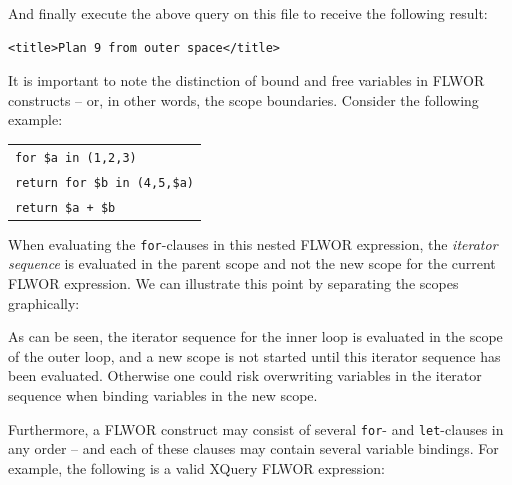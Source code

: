 And finally execute the above query on this file to receive the following
result:
\begin{center}
\begin{minipage}[h]{7.5cm}
\begin{verbatim}
<title>Plan 9 from outer space</title>
\end{verbatim}
\end{minipage}
\end{center}
It is important to note the distinction of bound and free variables in FLWOR
constructs -- or, in other words, the scope boundaries. Consider the following
example:
\begin{center}
\begin{tabular}{l}
\texttt{for \$a in (1,2,3)} \\ \quad
  \texttt{return for \$b in (4,5,\$a)}\\ \quad\quad
    \texttt{return \$a + \$b}
\end{tabular}
\end{center}

When evaluating the \texttt{for}-clauses in this nested FLWOR expression, the
\textit{iterator sequence} is evaluated in the parent scope and not the
new scope for the current FLWOR expression. We can illustrate this point by
separating the scopes graphically:

\begin{center}
\end{center}

As can be seen, the iterator sequence for the inner loop is evaluated in the
scope of the outer loop, and a new scope is not started until this iterator
sequence has been evaluated. Otherwise one could risk overwriting variables in
the iterator sequence when binding variables in the new scope.

Furthermore, a FLWOR construct may consist of several \texttt{for}- and
\texttt{let}-clauses in any order -- and each of these clauses may contain
several variable bindings. For example, the following is a valid XQuery
FLWOR expression:

